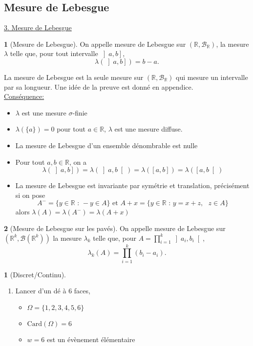 \documentclass[8pt,notheorems]{beamer}
\def \R{\mathbb R}
\theoremstyle{definition}
\newtheorem{definition}{\translate{Definition}}
\theoremstyle{example}
\newtheorem{example}{\translate{Exemple}}
\theoremstyle{mystyle}
\theoremstyle{plain}
\begin{document}
\subsection{Mesure de Lebesgue}
\begin{frame}[allowframebreaks]
\underline{3. Mesure de Lebesgue}\\
\begin{definition}[Mesure de Lebesgue]
On appelle mesure de Lebesgue sur $(\R,\mathcal{B}_\R)$, la mesure $\lambda$ telle que, pour tout intervalle $\left]a,b\right]$,
$$
\lambda(\left]a,b\right]) = b-a.
$$
\end{definition}
La mesure de Lebesgue est la seule mesure sur $(\R,\mathcal{B}_\R)$ qui mesure un intervalle par sa longueur. Une idée de la preuve est donné en appendice.\\
\underline{Conséquence:}
\begin{itemize}
    \item $\lambda$ est une mesure $\sigma$-finie
    \item $\lambda(\{a\})=0$ pour tout $a\in\R$, $\lambda$ est une mesure diffuse. 
    \item La mesure de Lebesgue d'un ensemble dénombrable est nulle
    \item Pour tout $a,b\in\R$, on a 
    $$
    \lambda(\left]a,b\right]) = \lambda(\left]a,b\right[) = \lambda(\left[a,b\right]) = \lambda(\left[a,b\right[) 
    $$
    \item La mesure de Lebesgue est invariante par symétrie et translation, précisément si on pose 
    $$
    A^{-} = \{y\in\R\text{ : }-y\in A\}\text{ et }A+x = \{y\in\R\text{ : }y = x+z,\text{ }z\in A\}
    $$ 
    alors $\lambda(A) = \lambda(A^{-}) = \lambda(A+x) $ 
\end{itemize}
\begin{definition}[Mesure de Lebesgue sur les pavés]
On appelle mesure de Lebesgue sur $(\R^k,\mathcal{B}(\R^k))$ la mesure $\lambda_k$ telle que, pour $A = \prod_{i = 1}^{k}\left]a_i,b_i\right[$, 
$$
\lambda_k(A) =\prod_{i = 1}^{k}(b_i-a_i).
$$
\end{definition}
\begin{example}[Discret/Continu]
\begin{enumerate}
\item Lancer d'un dé à $6$ faces,
\begin{itemize}
\item $\Omega=\{1,2,3,4,5,6\}$
\item $\text{Card}(\Omega)=6$
\item $w={6}$ est un évènement élémentaire

\end{itemize}
\end{enumerate}
\end{example}
\end{frame}
\end{document}
